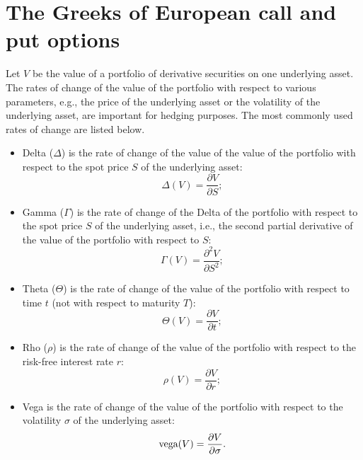 \section{The Greeks of European call and put options}
Let $ V $ be the value of a portfolio of derivative securities on one underlying
    asset.
The rates of change of the value of the portfolio with respect to various
    parameters, e.g., the price of the underlying asset or the volatility of the
    underlying asset, are important for hedging purposes.
The most commonly used rates of change are listed below.
\begin{itemize}
    \item Delta ($ \Delta $) is the rate of change of the value of the value of
        the portfolio with respect to the spot price $ S $ of the underlying
        asset:
        \begin{equation}
            \Delta(V) = \frac{\partial V}{\partial S};
            \label{eq:rate-of-change-of-value-to-price}
        \end{equation}
    \item Gamma ($ \Gamma $) is the rate of change of the Delta of the portfolio
        with respect to the spot price $ S $ of the underlying asset, i.e., the
        second partial derivative of the value of the portfolio with respect to
        $ S $:
        \begin{equation}
            \Gamma(V) = \frac{\partial^2 V}{\partial S^2};
            \label{eq:rate-of-change-of-delta}
        \end{equation}
    \item Theta ($ \Theta $) is the rate of change of the value of the portfolio
        with respect to time $ t $ (not with respect to maturity $ T $):
        \begin{equation}
            \Theta(V) = \frac{\partial V}{\partial t};
            \label{eq:rate-of-change-of-value-to-time}
        \end{equation}
    \item Rho ($ \rho $) is the rate of change of the value of the portfolio
        with respect to the risk-free interest rate $ r $:
        \begin{equation}
            \rho(V) = \frac{\partial V}{\partial r};
            \label{eq:rate-of-change-of-value-to-interest}
        \end{equation}
    \item Vega is the rate of change of the value of the portfolio with respect
        to the volatility $ \sigma $ of the underlying asset:
        \begin{equation}
            \text{vega}(V) = \frac{\partial V}{\partial \sigma}.
            \label{eq:rate-of-change-of-value-to-volatility}
        \end{equation}
\end{itemize}


